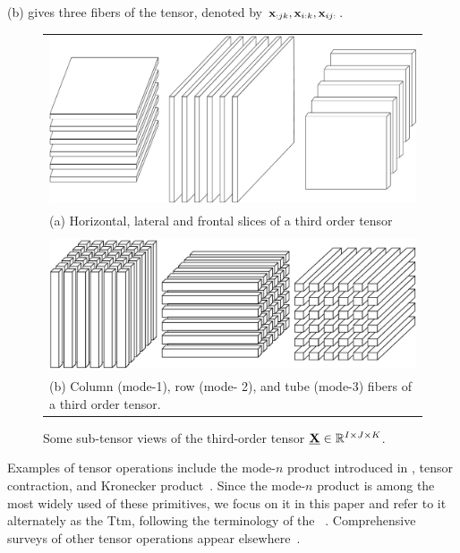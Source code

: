 (b) gives three fibers of the tensor, denoted by $\V{x}_{:jk}, \V{x}_{i:k}, \V{x}_{ij:}$.

\begin{figure}[htbp]
    \centering
    \begin{tabular}{>{\centering\arraybackslash}p{}}
    \includegraphics[width=0.55\linewidth]{figs/slices_own} \\
    (a) Horizontal, lateral and frontal slices of a third order tensor \\\\
    \includegraphics[scale=0.2]{figs/fibers_own} \\
    (b) Column (mode-1), row (mode- 2), and tube (mode-3) fibers of a third order tensor. \\
    \end{tabular}
    \caption{Some sub-tensor views of the third-order tensor $\T{X} \in \R^{I \times J \times K}$.}
    \label{fig:tensor-example}
\end{figure}

Examples of tensor operations include the mode-$n$ product introduced in , tensor contraction, and Kronecker product~\cite{Kolda:2009}.
Since the mode-$n$ product is among the most widely used of these primitives, we focus on it in this paper and refer to it alternately as the \acf{Ttm}, following the terminology of the \TensorToolbox~\cite{TensorToolbox}.
Comprehensive surveys of other tensor operations appear elsewhere~\cite{Kolda:2009, DBLP:journals/corr/Cichocki14}.

